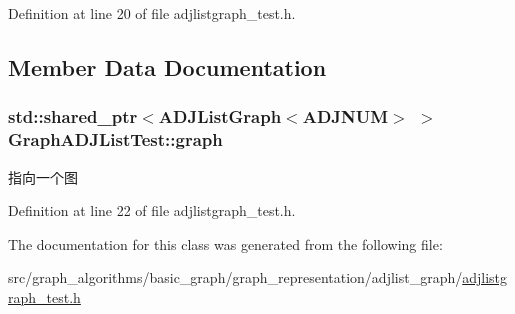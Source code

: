 Definition at line 20 of file adjlistgraph\+\_\+test.\+h.



\subsection{Member Data Documentation}
\hypertarget{class_graph_a_d_j_list_test_a2c21124ba286c96f94f6f0b036d5644e}{}
\subsubsection[{graph}]{\setlength{\rightskip}{0pt plus 5cm}std\+::shared\+\_\+ptr$<${\bf A\+D\+J\+List\+Graph}$<${\bf A\+D\+J\+N\+U\+M}$>$ $>$ Graph\+A\+D\+J\+List\+Test\+::graph\hspace{0.3cm}{\ttfamily [protected]}}\label{class_graph_a_d_j_list_test_a2c21124ba286c96f94f6f0b036d5644e}
指向一个图 

Definition at line 22 of file adjlistgraph\+\_\+test.\+h.



The documentation for this class was generated from the following file\+:\begin{DoxyCompactItemize}
\item 
src/graph\+\_\+algorithms/basic\+\_\+graph/graph\+\_\+representation/adjlist\+\_\+graph/\hyperlink{adjlistgraph__test_8h}{adjlistgraph\+\_\+test.\+h}\end{DoxyCompactItemize}
